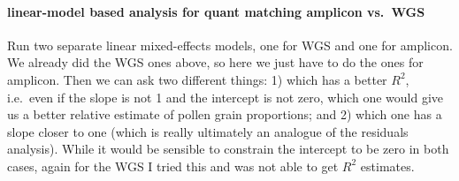 \documentclass[
]{article}
\begin{document}
\hypertarget{linear-model-based-analysis-for-quant-matching-amplicon-vs.-wgs}{%
\paragraph{linear-model based analysis for quant matching amplicon
vs.~WGS}\label{linear-model-based-analysis-for-quant-matching-amplicon-vs.-wgs}}

Run two separate linear mixed-effects models, one for WGS and one for
amplicon. We already did the WGS ones above, so here we just have to do
the ones for amplicon. Then we can ask two different things: 1) which
has a better \(R^2\), i.e.~even if the slope is not 1 and the intercept
is not zero, which one would give us a better relative estimate of
pollen grain proportions; and 2) which one has a slope closer to one
(which is really ultimately an analogue of the residuals analysis).
While it would be sensible to constrain the intercept to be zero in both
cases, again for the WGS I tried this and was not able to get \(R^2\)
estimates.
\end{document}

